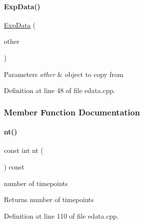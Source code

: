 \paragraph{\texorpdfstring{Exp\+Data()}{ExpData()}\hspace{0.1cm}{\footnotesize\ttfamily [8/8]}}
{\footnotesize\ttfamily \mbox{\hyperlink{classamici_1_1_exp_data}{Exp\+Data}} (\begin{DoxyParamCaption}\item[{const \mbox{\hyperlink{classamici_1_1_exp_data}{Exp\+Data}} \&}]{other }\end{DoxyParamCaption})}


\begin{DoxyParams}{Parameters}
{\em other} & object to copy from \\
\hline
\end{DoxyParams}


Definition at line 48 of file edata.\+cpp.



\subsubsection{Member Function Documentation}
\mbox{\label{classamici_1_1_exp_data_a7a59559fad838f7351cde47984c00ba0}} 
\paragraph{\texorpdfstring{nt()}{nt()}}
{\footnotesize\ttfamily const int nt (\begin{DoxyParamCaption}{ }\end{DoxyParamCaption}) const}

number of timepoints

\begin{DoxyReturn}{Returns}
number of timepoints 
\end{DoxyReturn}


Definition at line 110 of file edata.\+cpp.

